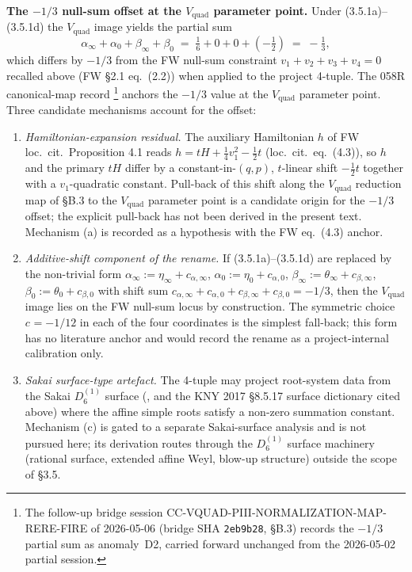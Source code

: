 \documentclass[11pt,reqno]{amsart}
\theoremstyle{plain}
\theoremstyle{definition}
\theoremstyle{remark}
\newcommand{\Vquad}{V_{\mathrm{quad}}}
\begin{document}
\medskip
\noindent\textbf{The $-1/3$ null-sum offset at the $\Vquad$
parameter point.}\hspace{0.5em}
Under (3.5.1a)--(3.5.1d) the $\Vquad$ image yields the partial
sum
\[
  \alpha_\infty + \alpha_0 + \beta_\infty + \beta_0
  \;=\; \tfrac{1}{6} + 0 + 0 + (-\tfrac{1}{2})
  \;=\; -\tfrac{1}{3},
\]
which differs by $-1/3$ from the FW null-sum constraint
$v_1 + v_2 + v_3 + v_4 = 0$ recalled above (FW \S 2.1
eq.\ (2.2)) when applied to the project 4-tuple. The 058R
canonical-map record \cite{siarc_cc_pipeline_g}\footnote{The
follow-up bridge session
{\rm CC-VQUAD-PIII-NORMALIZATION-MAP-RERE-FIRE} of
2026-05-06 (bridge SHA \texttt{2eb9b28}, \S B.3) records the
$-1/3$ partial sum as anomaly~D2, carried forward unchanged
from the 2026-05-02 partial session.} anchors the $-1/3$ value
at the $\Vquad$ parameter point. Three candidate mechanisms
account for the offset:
\begin{enumerate}[label=(\alph*)]
\item {\em Hamiltonian-expansion residual.}\hspace{0.5em}
The auxiliary Hamiltonian $h$ of FW loc.\ cit.\ Proposition 4.1
reads $h = t H + \tfrac{1}{4} v_1^{2} - \tfrac{1}{2} t$
(loc.\ cit.\ eq.\ (4.3)), so $h$ and the primary $t H$ differ
by a constant-in-$(q, p)$, $t$-linear shift $-\tfrac{1}{2} t$
together with a $v_1$-quadratic constant. Pull-back of this
shift along the $\Vquad$ reduction map of
\cite{siarc_cc_pipeline_g} \S B.3 to the $\Vquad$ parameter
point is a candidate origin for the $-1/3$ offset; the
explicit pull-back has not been derived in the present text.
Mechanism (a) is recorded as a hypothesis with the FW
eq.\ (4.3) anchor.
\item {\em Additive-shift component of the rename.}\hspace{0.5em}
If (3.5.1a)--(3.5.1d) are replaced by the non-trivial form
$\alpha_\infty := \eta_\infty + c_{\alpha,\infty}$,
$\alpha_0 := \eta_0 + c_{\alpha,0}$,
$\beta_\infty := \theta_\infty + c_{\beta,\infty}$,
$\beta_0 := \theta_0 + c_{\beta,0}$ with shift sum
$c_{\alpha,\infty} + c_{\alpha,0} + c_{\beta,\infty}
+ c_{\beta,0} = -1/3$, then the $\Vquad$ image lies on the FW
null-sum locus by construction. The symmetric choice $c_{} =
-1/12$ in each of the four coordinates is the simplest
fall-back; this form has no literature anchor and would record
the rename as a project-internal calibration only.
\item {\em Sakai surface-type artefact.}\hspace{0.5em}
The 4-tuple may project root-system data from the Sakai
$D_6^{(1)}$ surface (\cite{ohyama2006studies,
noumiyamada1998painleve}, and the KNY 2017 \S 8.5.17 surface
dictionary cited above) where the affine simple roots satisfy
a non-zero summation constant. Mechanism (c) is gated to a
separate Sakai-surface analysis and is not pursued here; its
derivation routes through the $D_6^{(1)}$ surface machinery
(rational surface, extended affine Weyl, blow-up structure)
outside the scope of \S 3.5.
\end{enumerate}
\end{document}
